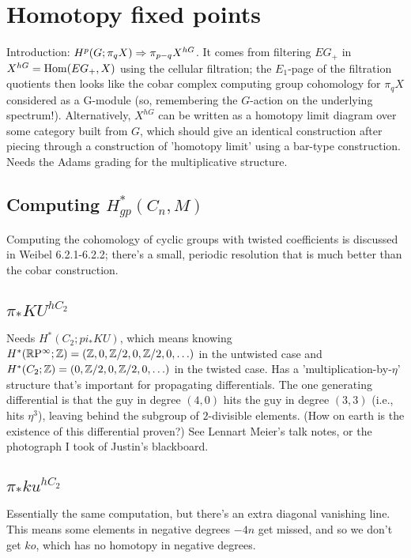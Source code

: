 \chapter{Homotopy fixed points}

Introduction: $H^p(G; \pi_q X) \Rightarrow \pi_{p-q} X^{hG}$. It comes from filtering $EG_+$ in $X^{hG} = \operatorname{Hom}(EG_+, X)$ using the cellular filtration; the $E_1$-page of the filtration quotients then looks like the cobar complex computing group cohomology for $\pi_q X$ considered as a G-module (so, remembering the $G$-action on the underlying spectrum!).  Alternatively, $X^{hG}$ can be written as a homotopy limit diagram over some category built from $G$, which should give an identical construction after piecing through a construction of 'homotopy limit' using a bar-type construction.  Needs the Adams grading for the multiplicative structure.

\section{Computing $H^*_{gp}(C_n, M)$}

Computing the cohomology of cyclic groups with twisted coefficients is discussed in Weibel 6.2.1-6.2.2; there's a small, periodic resolution that is much better than the cobar construction.

\section{$\pi_* KU^{hC_2}$}

Needs $H^*(C_2; pi_* KU)$, which means knowing $H^*(\mathbb{R}\mathrm{P}^\infty; \mathbb{Z}) = (\mathbb{Z}, 0, \mathbb{Z}/2, 0, \mathbb{Z}/2, 0, \ldots)$ in the untwisted case and $H^*(C_2; \mathbb{Z}) = (0, \mathbb{Z}/2, 0, \mathbb{Z}/2, 0, \ldots)$ in the twisted case.  Has a 'multiplication-by-$\eta$' structure that's important for propagating differentials.  The one generating differential is that the guy in degree $(4, 0)$ hits the guy in degree $(3, 3)$ (i.e., hits $\eta^3$), leaving behind the subgroup of $2$-divisible elements.  (How on earth is the existence of this differential proven?)  See Lennart Meier's talk notes, or the photograph I took of Justin's blackboard.

\section{$\pi_* ku^{hC_2}$}

Essentially the same computation, but there's an extra diagonal vanishing line.  This means some elements in negative degrees $-4n$ get missed, and so we don't get $ko$, which has no homotopy in negative degrees.


